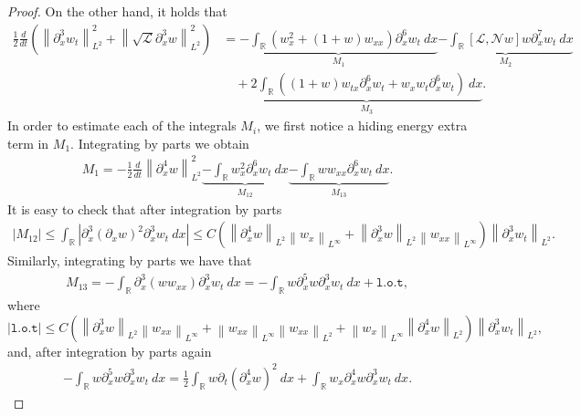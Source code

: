 \documentclass[final,11pt,a4paper,reqno]{amsart}
\newcommand{\norm}[1]{\left\| #1 \right\|}
\newcommand{\RR}{\mathbb R}
\newcommand{\pa}{\partial}
\theoremstyle{definition}
\begin{document}
\begin{proof}
On the other hand, it holds that
\begin{align*}
\frac{1}{2}\frac{d}{dt}\left(\norm{\pa_{x}^{3}w_{t}}_{L^{2}}^{2}+\norm{\sqrt{\mathscr{L}}\pa_{x}^{3}w}_{L^{2}}^{2}\right)&=\underbrace{-\int_{\RR}(w_{x}^{2}+(1+w)w_{xx})\pa_{x}^{6}w_{t}  \ dx}_{M_{1}}\underbrace{-\int_{\RR} \left[\mathscr{L},\mathscr{N}w\right]w \pa_{x}^{7}w_{t} \ dx}_{M_{2}}  \\
&\quad + \underbrace{2\int_{\RR}\left( (1+w)w_{tx}\pa_{x}^{6}w_{t}+w_{x}w_{t}\pa_{x}^{6}w_{t}\right) \ dx}_{M_{3}}.
\end{align*}
In order to estimate each of the integrals $M_{i}$, we first notice a hiding energy extra term in $M_{1}$. Integrating by parts we obtain
\begin{align*}
M_{1}= -\frac{1}{2}\frac{d}{dt}\norm{\pa_{x}^{4}w}_{L^{2}}^{2} \underbrace{-\int_{\mathbb{R}} w_{x}^{2} \pa_{x}^{6}w_{t} \  dx}_{M_{12}}\underbrace{-\int_{\mathbb{R}}w w_{xx} \pa_{x}^{6}w_{t} \ dx}_{M_{13}}.
\end{align*}
It is easy to check that after integration by parts 
\begin{align}\label{M12:estimate}
\left|M_{12}\right| \leq \int_{\RR} \left| \pa_{x}^{3}(\pa_{x}w)^{2} \pa_{x}^{3}w_{t} \ dx \right| \leq C\left(\norm{\pa_{x}^{4}w}_{L^{2}}\norm{w_{x}}_{L^\infty}+\norm{\pa_{x}^{3}w}_{L^2}\norm{w_{xx}}_{L^\infty} \right) \norm{\pa_{x}^{3}w_{t}}_{L^2}.
\end{align}
Similarly, integrating by parts we have that
\begin{align}\label{adg16b}
M_{13}= -\int_{\RR}  \pa_{x}^{3}(ww_{xx}) \pa_{x}^{3}w_{t} \ dx= -\int_{\RR} w \pa_{x}^{5}w \pa_{x}^{3}w_{t} \ dx + \texttt{l.o.t},
\end{align}
where 
\begin{equation}\label{lot}
| \texttt{l.o.t}| \leq C\left(  \norm{\pa_{x}^{3}w}_{L^{2}}\norm{w_{xx}}_{L^{\infty}}+\norm{w_{xx}}_{L^{\infty}}\norm{w_{xx}}_{L^2}+\norm{w_x}_{L^{\infty}}\norm{\pa_{x}^{4}w}_{L^{2}}\right)\norm{\pa_{x}^{3}w_{t}}_{L^{2}},
\end{equation}
and, after integration by parts again
\begin{align}\label{adg17}
-\int_{\RR}w \pa_{x}^{5}w \pa_{x}^{3}w_{t} \  dx=\frac{1}{2}\int_{\RR} w\pa_{t}(\pa_{x}^{4}w)^{2} \ dx+\int_{\RR} w_{x}\pa_{x}^{4}w \pa_{x}^{3}w_{t} \ dx .
\end{align}

\end{proof}
\end{document}
